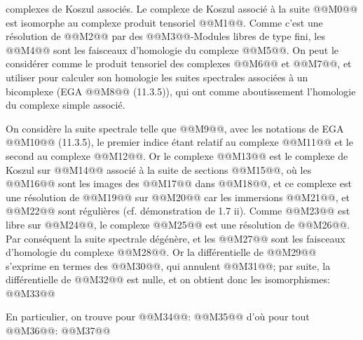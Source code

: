 
complexes de Koszul associés. Le complexe de Koszul associé à la suite @@M0@@ est isomorphe au complexe produit tensoriel @@M1@@. Comme c'est une résolution de @@M2@@ par des @@M3@@-Modules libres de type fini, les @@M4@@ sont les faisceaux d'homologie du complexe @@M5@@. On peut le considérer comme le produit tensoriel des complexes @@M6@@ et @@M7@@, et utiliser pour calculer son homologie les suites spectrales associées à un bicomplexe (EGA @@M8@@ (11.3.5)), qui ont comme aboutissement l'homologie du complexe simple associé.

On considère la suite spectrale telle que @@M9@@, avec les notations de EGA @@M10@@ (11.3.5), le premier indice étant relatif au complexe @@M11@@ et le second au complexe @@M12@@. Or le complexe @@M13@@ est le complexe de Koszul sur @@M14@@ associé à la suite de sections @@M15@@, où les @@M16@@ sont les images des @@M17@@ dans @@M18@@, et ce complexe est une résolution de @@M19@@ sur @@M20@@ car les immersions @@M21@@, et @@M22@@ sont régulières (cf. démonstration de 1.7 ii). Comme @@M23@@ est libre sur @@M24@@, le complexe @@M25@@ est une résolution de @@M26@@. Par conséquent la suite spectrale dégénère, et les @@M27@@ sont les faisceaux d'homologie du complexe @@M28@@. Or la différentielle de @@M29@@ s'exprime en termes des @@M30@@, qui annulent @@M31@@; par suite, la différentielle de @@M32@@ est nulle, et on obtient donc les isomorphismes:
@@M33@@

En particulier, on trouve pour @@M34@@:
@@M35@@
d'où pour tout @@M36@@:
@@M37@@

